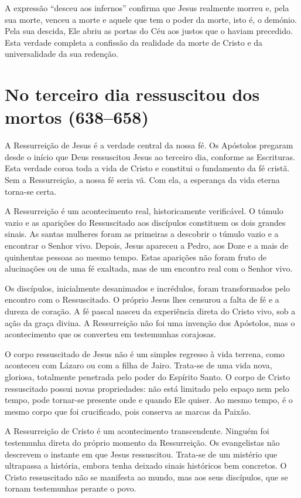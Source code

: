 A expressão ``desceu aos infernos'' confirma que Jesus realmente morreu e, pela sua morte, venceu a morte e aquele que tem o poder da morte, isto é, o demónio. Pela sua descida, Ele abriu as portas do Céu aos justos que o haviam precedido. Esta verdade completa a confissão da realidade da morte de Cristo e da universalidade da sua redenção.

\section{No terceiro dia ressuscitou dos mortos (638--658)}

A Ressurreição de Jesus é a verdade central da nossa fé. Os Apóstolos pregaram desde o início que Deus ressuscitou Jesus ao terceiro dia, conforme as Escrituras. Esta verdade coroa toda a vida de Cristo e constitui o fundamento da fé cristã. Sem a Ressurreição, a nossa fé seria vã. Com ela, a esperança da vida eterna torna-se certa.

A Ressurreição é um acontecimento real, historicamente verificável. O túmulo vazio e as aparições do Ressuscitado aos discípulos constituem os dois grandes sinais. As santas mulheres foram as primeiras a descobrir o túmulo vazio e a encontrar o Senhor vivo. Depois, Jesus apareceu a Pedro, aos Doze e a mais de quinhentas pessoas ao mesmo tempo. Estas aparições não foram fruto de alucinações ou de uma fé exaltada, mas de um encontro real com o Senhor vivo.

Os discípulos, inicialmente desanimados e incrédulos, foram transformados pelo encontro com o Ressuscitado. O próprio Jesus lhes censurou a falta de fé e a dureza de coração. A fé pascal nasceu da experiência direta do Cristo vivo, sob a ação da graça divina. A Ressurreição não foi uma invenção dos Apóstolos, mas o acontecimento que os converteu em testemunhas corajosas.

O corpo ressuscitado de Jesus não é um simples regresso à vida terrena, como aconteceu com Lázaro ou com a filha de Jairo. Trata-se de uma vida nova, gloriosa, totalmente penetrada pelo poder do Espírito Santo. O corpo de Cristo ressuscitado possui novas propriedades: não está limitado pelo espaço nem pelo tempo, pode tornar-se presente onde e quando Ele quiser. Ao mesmo tempo, é o mesmo corpo que foi crucificado, pois conserva as marcas da Paixão.

A Ressurreição de Cristo é um acontecimento transcendente. Ninguém foi testemunha direta do próprio momento da Ressurreição. Os evangelistas não descrevem o instante em que Jesus ressuscitou. Trata-se de um mistério que ultrapassa a história, embora tenha deixado sinais históricos bem concretos. O Cristo ressuscitado não se manifesta ao mundo, mas aos seus discípulos, que se tornam testemunhas perante o povo.

